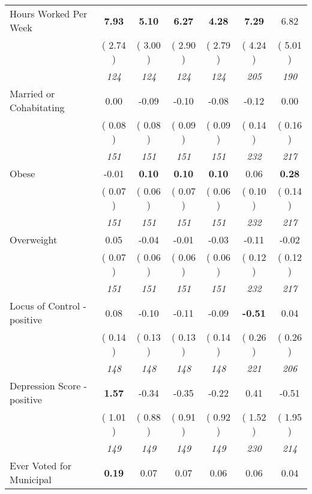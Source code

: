 \begin{tabular}{l c c c c c c}
Hours Worked Per Week & \textbf{      7.93 } & \textbf{      5.10 } & \textbf{      6.27 } & \textbf{     4.28} & \textbf{      7.29 } &      6.82 \\
& (     2.74 ) & (     3.00 ) & (     2.90 ) & (     2.79 ) & (     4.24 ) & (     5.01 ) \\
& \textit{ 124 } & \textit{ 124 } & \textit{ 124 } & \textit{ 124 } & \textit{ 205 } & \textit{ 190 } \\
Married or Cohabitating &      0.00 &     -0.09 &     -0.10 &     -0.08 &     -0.12 &      0.00 \\
& (     0.08 ) & (     0.08 ) & (     0.09 ) & (     0.09 ) & (     0.14 ) & (     0.16 ) \\
& \textit{ 151 } & \textit{ 151 } & \textit{ 151 } & \textit{ 151 } & \textit{ 232 } & \textit{ 217 } \\
Obese &     -0.01 & \textbf{      0.10 } & \textbf{      0.10 } & \textbf{     0.10} &      0.06 & \textbf{      0.28 } \\
& (     0.07 ) & (     0.06 ) & (     0.07 ) & (     0.06 ) & (     0.10 ) & (     0.14 ) \\
& \textit{ 151 } & \textit{ 151 } & \textit{ 151 } & \textit{ 151 } & \textit{ 232 } & \textit{ 217 } \\
Overweight &      0.05 &     -0.04 &     -0.01 &     -0.03 &     -0.11 &     -0.02 \\
& (     0.07 ) & (     0.06 ) & (     0.06 ) & (     0.06 ) & (     0.12 ) & (     0.12 ) \\
& \textit{ 151 } & \textit{ 151 } & \textit{ 151 } & \textit{ 151 } & \textit{ 232 } & \textit{ 217 } \\
Locus of Control - positive &      0.08 &     -0.10 &     -0.11 &     -0.09 & \textbf{     -0.51 } &      0.04 \\
& (     0.14 ) & (     0.13 ) & (     0.13 ) & (     0.14 ) & (     0.26 ) & (     0.26 ) \\
& \textit{ 148 } & \textit{ 148 } & \textit{ 148 } & \textit{ 148 } & \textit{ 221 } & \textit{ 206 } \\
Depression Score - positive & \textbf{      1.57 } &     -0.34 &     -0.35 &     -0.22 &      0.41 &     -0.51 \\
& (     1.01 ) & (     0.88 ) & (     0.91 ) & (     0.92 ) & (     1.52 ) & (     1.95 ) \\
& \textit{ 149 } & \textit{ 149 } & \textit{ 149 } & \textit{ 149 } & \textit{ 230 } & \textit{ 214 } \\
Ever Voted for Municipal & \textbf{      0.19 } &      0.07 &      0.07 &      0.06 &      0.06 &      0.04 \\

\end{tabular}
